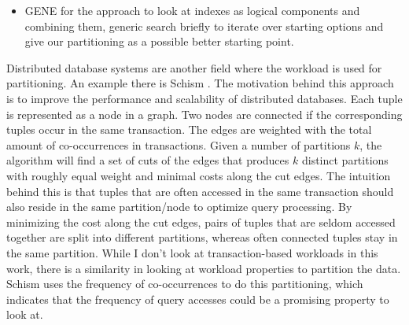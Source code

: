     \begin{itemize}
    \item GENE \cite{Dittrich2021} for the approach to look at indexes as logical components and combining them, generic
    search briefly to iterate over starting options and give our partitioning as a possible better starting point.
    \end{itemize}

Distributed database systems are another field where the workload is used for partitioning. An example there is Schism \cite{Curino2010}. The motivation behind this approach is to improve the performance and scalability of distributed databases. Each tuple is represented as a node in a graph. Two nodes are connected if the corresponding tuples occur in the same transaction. The edges are weighted with the total amount of co-occurrences in transactions. Given a number of partitions $k$, the algorithm will ﬁnd a set of cuts of the edges that produces $k$ distinct partitions with roughly equal weight and minimal costs along the cut edges. The intuition behind this is that tuples that are often accessed in the same transaction should also reside in the same partition/node to optimize query processing. By minimizing the cost along the cut edges, pairs of tuples that are seldom accessed together are split into diﬀerent partitions, whereas often connected tuples stay in the same partition. While I don't look at transaction-based workloads in this work, there is a similarity in looking at workload properties to partition the data. Schism uses the frequency of co-occurrences to do this partitioning, which indicates that the frequency of query accesses could be a promising property to look at.